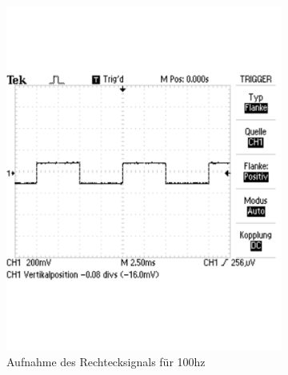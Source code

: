 \documentclass[12pt,a4paper]{article}
\begin{document}
\begin{figure}[H]
        \centering
        \begin{subfigure}[tb]{0.48\textwidth}
                \includegraphics[width=\textwidth , scale = 0.4]{3_1_100hz.pdf}
				\caption[Aufnahme des Rechtecksignals für 100hz]{Aufnahme des Rechtecksignals für 100hz}
 	 			\label{fig:3_1_100hz}
        \end{subfigure}%
        ~ %
        \hfill
        \begin{subfigure}[tb]{0.48\textwidth}

\end{subfigure}
\end{figure}
\end{document}
